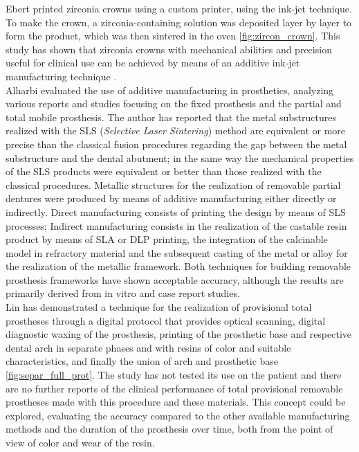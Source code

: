 Ebert printed zirconia crowns using a custom printer, using the ink-jet technique. To make the crown, a zirconia-containing solution was deposited layer by layer to form the product, which was then sintered in the oven \ref{fig:zircon_crown}. This study has shown that zirconia crowns with mechanical abilities and precision useful for clinical use can be achieved by means of an additive ink-jet manufacturing technique \parencite{Reference106}. \\
Alharbi \parencite{Reference107} evaluated the use of additive manufacturing in prosthetics, analyzing various reports and studies focusing on the fixed prosthesis and the partial and total mobile prosthesis. The author has reported that the metal substructures realized with the SLS (\emph{Selective Laser Sintering}) method are equivalent or more precise than the classical fusion procedures regarding the gap between the metal substructure and the dental abutment; in the same way the mechanical properties of the SLS products were equivalent or better than those realized with the classical procedures. Metallic structures for the realization of removable partial dentures were produced by means of additive manufacturing either directly or indirectly. Direct manufacturing consists of printing the design by means of SLS processes; Indirect manufacturing consists in the realization of the castable resin product by means of SLA or DLP printing, the integration of the calcinable model in refractory material and the subsequent casting of the metal or alloy for the realization of the metallic framework. Both techniques for building removable prosthesis frameworks have shown acceptable accuracy, although the results are primarily derived from in vitro and case report studies. \\
Lin \parencite{Reference108} has demonstrated a technique for the realization of provisional total prostheses through a digital protocol that provides optical scanning, digital diagnostic waxing of the prosthesis, printing of the prosthetic base and respective dental arch in separate phases and with resins of color and suitable characteristics, and finally the union of arch and prosthetic base \ref{fig:separ_full_prot}. The study has not tested its use on the patient and there are no further reports of the clinical performance of total provisional removable prostheses made with this procedure and these materials. This concept could be explored, evaluating the accuracy compared to the other available manufacturing methods and the duration of the prosthesis over time, both from the point of view of color and wear of the resin.
